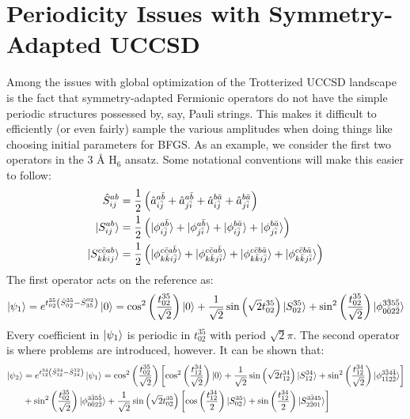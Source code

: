 \documentclass{article}
\begin{document}
\section{Periodicity Issues with Symmetry-Adapted UCCSD}
Among the issues with global optimization of the Trotterized UCCSD landscape is the fact that symmetry-adapted Fermionic operators do not have the simple periodic structures possessed by, say, Pauli strings.  This makes it difficult to efficiently (or even fairly) sample the various amplitudes when doing things like choosing initial parameters for BFGS.  As an example, we consider the first two operators in the 3 \AA{} H$_6$ ansatz.  Some notational conventions will make this easier to follow:
\begin{align}
\hat{S}_{ij}^{ab} &= \frac{1}{2}\left(\hat{a}_{i\bar{j}}^{a\bar{b}}+\hat{a}_{j\bar{i}}^{a\bar{b}}+\hat{a}_{i\bar{j}}^{b\bar{a}}+\hat{a}_{j\bar{i}}^{b\bar{a}}\right)\\
\ket{S_{ij}^{ab}} &= \frac{1}{2}\left(\ket{\phi_{i\bar{j}}^{a\bar{b}}}+\ket{\phi_{j\bar{i}}^{a\bar{b}}}+\ket{\phi_{i\bar{j}}^{b\bar{a}}}+\ket{\phi_{j\bar{i}}^{b\bar{a}}}\right)\\
\ket{S_{k\bar{k}ij}^{c\bar{c}ab}} &= \frac{1}{2}\left(\ket{\phi_{k\bar{k}i\bar{j}}^{c\bar{c}a\bar{b}}}+\ket{\phi_{k\bar{k}j\bar{i}}^{c\bar{c}a\bar{b}}}+\ket{\phi_{k\bar{k}i\bar{j}}^{c\bar{c}b\bar{a}}}+\ket{\phi_{k\bar{k}j\bar{i}}^{c\bar{c}b\bar{a}}} \right)
\end{align}
The first operator acts on the reference as:
\begin{equation}
\ket{\psi_1} = e^{t_{02}^{35}\left(\hat{S}_{02}^{35}-\hat{S}_{35}^{02}\right)}\ket{0} = \cos^2\left(\frac{t_{02}^{35}}{\sqrt{2}}\right)\ket{0} + \frac{1}{\sqrt{2}}\sin\left(\sqrt{2}t_{02}^{35}\right)\ket{S_{02}^{35}} + \sin^2\left(\frac{t_{02}^{35}}{\sqrt{2}}\right)\ket{\phi_{0\bar{0}2\bar{2}}^{3\bar{3}5\bar{5}}}
\end{equation}
Every coefficient in $\ket{\psi_1}$ is periodic in $t_{02}^{35}$ with period $\sqrt{2}\pi$.  The second operator is where problems are introduced, however.  It can be shown that:
\begin{align}
\ket{\psi_2} &=  e^{t_{12}^{34}\left(\hat{S}_{12}^{34}-\hat{S}_{34}^{12}\right)}\ket{\psi_1} = \cos^2\left(\frac{t_{02}^{35}}{\sqrt{2}}\right)\left[\cos^2\left(\frac{t_{12}^{34}}{\sqrt{2}}\right)\ket{0} + \frac{1}{\sqrt{2}}\sin\left(\sqrt{2}t_{12}^{34}\right)\ket{S_{12}^{34}} + \sin^2\left(\frac{t_{12}^{34}}{\sqrt{2}}\right)\ket{\phi_{1\bar{1}2\bar{2}}^{3\bar{3}4\bar{4}}}\right]\\
&+\sin^2\left(\frac{t_{02}^{35}}{\sqrt{2}}\right)\ket{\phi_{0\bar{0}2\bar{2}}^{3\bar{3}5\bar{5}}}+\frac{1}{\sqrt{2}}\sin\left(\sqrt{2}t_{02}^{35}\right)\left[\cos\left(\frac{t_{12}^{34}}{2}\right)\ket{S_{02}^{35}}+\sin\left(\frac{t_{12}^{34}}{2}\right)\ket{S_{2\bar{2}01}^{3\bar{3}45}}\right]
\end{align}
\end{document}

